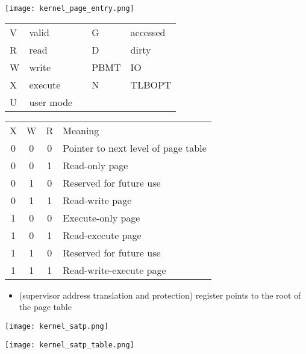 
\begin{center}
    \texttt{[image: kernel\_page\_entry.png]}
\end{center}

\renewcommand{\arraystretch}{1.3}
\setlength{\oldtabcolsep}{\tabcolsep}\setlength\tabcolsep{6pt}

\begin{tabularx}{\linewidth}{@{}llcll@{}}
    V & valid     &  & G    & accessed \\
    R & read      &  & D    & dirty    \\
    W & write     &  & PBMT & IO       \\
    X & execute   &  & N    & TLBOPT   \\
    U & user mode &  &
\end{tabularx}

\begin{tabularx}{\linewidth}{@{}cccl@{}}
    X & W & R & Meaning                             \\
    \cmidrule{1-4}
    0 & 0 & 0 & Pointer to next level of page table \\
    0 & 0 & 1 & Read-only page                      \\
    0 & 1 & 0 & Reserved for future use             \\
    0 & 1 & 1 & Read-write page                     \\
    1 & 0 & 0 & Execute-only page                   \\
    1 & 0 & 1 & Read-execute page                   \\
    1 & 1 & 0 & Reserved for future use             \\
    1 & 1 & 1 & Read-write-execute page
\end{tabularx}

\renewcommand{\arraystretch}{1}
\setlength\tabcolsep{\oldtabcolsep}

\newpar{}
\begin{itemize}
    \item {} (supervisor address translation and protection) register points to the root of the page table
\end{itemize}
\begin{center}
    \texttt{[image: kernel\_satp.png]}
\end{center}
\begin{center}
    \texttt{[image: kernel\_satp\_table.png]}
\end{center}

